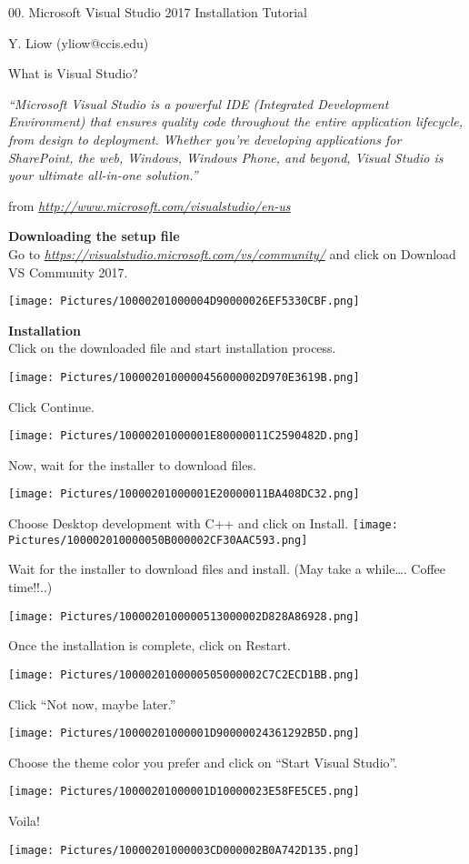 \documentclass[
]{article}
\author{}
\date{}
\begin{document}
00. Microsoft Visual Studio 2017 Installation Tutorial

Y. Liow (yliow@ccis.edu)

What is Visual Studio?

\emph{``Microsoft Visual Studio is a powerful IDE (Integrated
Development Environment) that ensures quality code throughout the entire
application lifecycle, from design to deployment. Whether you're
developing applications for SharePoint, the web, Windows, Windows Phone,
and beyond, Visual Studio is your ultimate all-in-one solution.''}

from
\href{http://www.microsoft.com/visualstudio/en-us}{\emph{\emph{http://www.microsoft.com/visualstudio/en-us}}}

\hfill\break

\textbf{Downloading the setup file\\
}Go to
\href{https://visualstudio.microsoft.com/vs/community/}{\emph{https://visualstudio.microsoft.com/vs/community/}}
and click on Download VS Community 2017.

\texttt{[image: Pictures/10000201000004D90000026EF5330CBF.png]}

\textbf{Installation\\
}Click on the downloaded file and start installation process.

\texttt{[image: Pictures/1000020100000456000002D970E3619B.png]}

Click Continue.

\texttt{[image: Pictures/10000201000001E80000011C2590482D.png]}

Now, wait for the installer to download files.

\texttt{[image: Pictures/10000201000001E20000011BA408DC32.png]}

Choose Desktop development with C++ and click on Install.
\texttt{[image: Pictures/100002010000050B000002CF30AAC593.png]}

Wait for the installer to download files and install. (May take a
while\ldots. Coffee time!!..)

\texttt{[image: Pictures/1000020100000513000002D828A86928.png]}

Once the installation is complete, click on Restart.

\texttt{[image: Pictures/1000020100000505000002C7C2ECD1BB.png]}

Click ``Not now, maybe later.''

\texttt{[image: Pictures/10000201000001D90000024361292B5D.png]}

Choose the theme color you prefer and click on ``Start Visual Studio''.

\texttt{[image: Pictures/10000201000001D10000023E58FE5CE5.png]}

Voila!

\texttt{[image: Pictures/10000201000003CD000002B0A742D135.png]}
\end{document}
